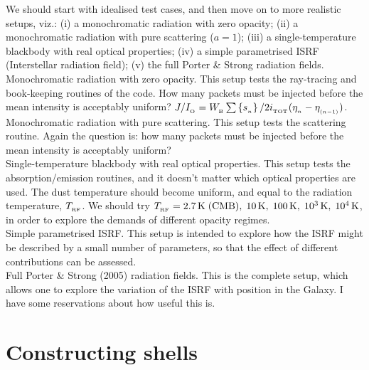 \documentclass[usenatbib]{mn2e}
\numberwithin{equation}{section}
\begin{document}
We should start with idealised test cases, and then move on to more realistic setups, viz.: (i) a monochromatic radiation with zero opacity; (ii) a monochromatic radiation with pure scattering ($a=1$); (iii) a single-temperature blackbody with real optical properties; (iv) a simple parametrised ISRF (Interstellar radiation field); (v) the full Porter \& Strong radiation fields. \\
{\sc Monochromatic radiation with zero opacity.} This setup tests the ray-tracing and book-keeping routines of the code. How many packets must be injected before the mean intensity is acceptably uniform? $J/I_{_{\rm O}}=W_{_{\rm B}}\sum\left\{s_{_n}\right\}/2i_{_{\rm TOT}}(\eta_{_n}-\eta_{_{(n-1)}})$. \\
{\sc Monochromatic radiation with pure scattering.} This setup tests the scattering routine. Again the question is: how many packets must be injected before the mean intensity is acceptably uniform? \\
{\sc Single-temperature blackbody with real optical properties.} This setup tests the absorption/emission routines, and it doesn't matter which optical properties are used. The dust temperature should become uniform, and equal to the radiation temperature, $T_{_{\rm RF}}$. We should try $T_{_{\rm RF}}=2.7\,{\rm K}\;\mbox{(CMB)},\;10\,{\rm K},\;100\,{\rm K},\;10^3\,{\rm K},\;10^4\,{\rm K}$, in order to explore the demands of different opacity regimes. \\
{\sc Simple parametrised ISRF.} This setup is intended to explore how the ISRF might be described by a small number of parameters, so that the effect of different contributions can be assessed. \\
{\sc Full Porter \& Strong (2005) radiation fields.} This is the complete setup, which allows one to explore the variation of the ISRF with position in the Galaxy. I have some reservations about how useful this is. 





\section{Constructing shells}
\end{document}
